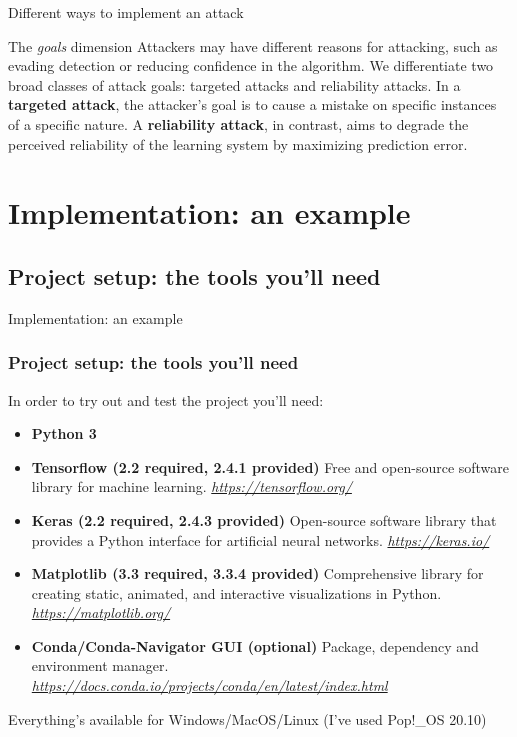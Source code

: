 \documentclass[8pt]{beamer}
\begin{document}
\begin{frame}{Different ways to implement an attack}
\begin{block}{The \textit{goals} dimension}
Attackers may have different reasons for attacking, such as evading detection or
reducing confidence in the algorithm. We differentiate two broad classes of attack goals: targeted attacks and reliability attacks. In a \textbf{targeted attack}, the attacker’s goal is to cause a mistake on specific instances of a specific nature. A \textbf{reliability attack}, in contrast, aims to degrade the perceived reliability of the learning system by maximizing prediction error.
\end{block}
\end{frame}


\section{Implementation: an example}
\subsection{Project setup: the tools you'll need}
\begin{frame}{}
\Huge{\centerline{Implementation: an example}}
\end{frame}
\begin{frame}
\frametitle{Project setup: the tools you'll need}
In order to try out and test the project you'll need:
\vspace{0.3cm}
\begin{itemize}
    \setlength\itemsep{1em}
    
    \item \textbf{Python 3}
    
    \item \textbf{Tensorflow (2.2 required, 2.4.1 provided)} Free and open-source software library for machine learning. \href{https://www.tensorflow.org/}{\textit{https://tensorflow.org/}}
    
    \item \textbf{Keras (2.2 required, 2.4.3 provided)} Open-source software library that provides a Python interface for artificial neural networks. \href{https://keras.io/}{\textit{https://keras.io/}}
    
    \item \textbf{Matplotlib (3.3 required, 3.3.4 provided)} Comprehensive library for creating static, animated, and interactive visualizations in Python. \href{https://matplotlib.org/}{\textit{https://matplotlib.org/}}
    
    \item \textbf{Conda/Conda-Navigator GUI (optional)} Package, dependency and environment manager. \href{https://docs.conda.io/projects/conda/en/latest/index.html}{\textit{https://docs.conda.io/projects/conda/en/latest/index.html}}
\end{itemize}
\vspace{0.5cm}
Everything's available for Windows/MacOS/Linux (I've used Pop!\_OS 20.10)
\end{frame}
\end{document}
